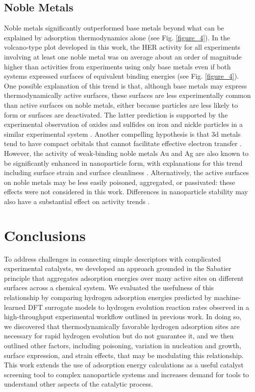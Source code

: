 \documentclass[preprint,12pt]{elsarticle}
\begin{document}
\subsection{Noble Metals}\label{Section:Results/Noble}
Noble metals significantly outperformed base metals beyond what can be explained by adsorption thermodynamics alone (see Fig. \ref{figure_4}). In the volcano-type plot developed in this work, the HER activity for all experiments involving at least one noble metal was on average about an order of magnitude higher than activities from experiments using only base metals even if both systems expressed surfaces of equivalent binding energies (see Fig. \ref{figure_4}). One possible explanation of this trend is that, although base metals may express thermodynamically active surfaces, these surfaces are less experimentally common than active surfaces on noble metals, either because particles are less likely to form or surfaces are deactivated. The latter prediction is supported by the experimental observation of oxides and sulfides on iron and nickle particles in a similar experimental system \cite{bhat2022accelerated}. Another compelling hypothesis is that 3d metals tend to have compact orbitals that cannot facilitate effective electron transfer \cite{quaino2014volcano}. However, the activity of weak-binding noble metals Au and Ag are also known to be significantly enhanced in nanoparticle form, with explanations for this trend including surface strain and surface cleanliness \cite{tran2018gold,campbell2009hydrogen,amin2014situ,merga2010naked,falsig2008trends}. Alternatively, the active surfaces on noble metals may be less easily poisoned, aggregated, or passivated: these effects were not considered in this work. Differences in nanoparticle stability may also have a substantial effect on activity trends \cite{simon2022ligand}.


\section{Conclusions}\label{Section:Conclusions}
To address challenges in connecting simple descriptors with complicated experimental catalysts, we developed an approach grounded in the Sabatier principle that aggregates adsorption energies over many active sites on different surfaces across a chemical system. We evaluated the usefulness of this relationship by comparing hydrogen adsorption energies predicted by machine-learned DFT surrogate models to hydrogen evolution reaction rates observed in a high-throughput experimental workflow outlined in previous work. In doing so, we discovered that thermodynamically favorable hydrogen adsorption sites are necessary for rapid hydrogen evolution but do not guarantee it, and we then outlined other factors, including poisoning, variation in nucleation and growth, surface expression, and strain effects, that may be modulating this relationship. This work extends the use of adsorption energy calculations as a useful catalyst screening tool to complex nanoparticle systems and increases demand for tools to understand other aspects of the catalytic process.
\end{document}
